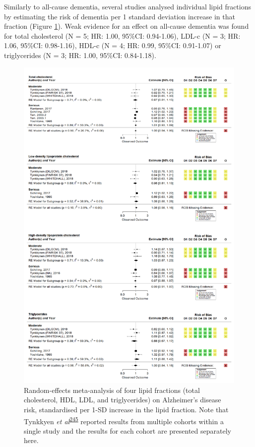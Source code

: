 \documentclass[a4paper, twoside]{templates/ociamthesis}
\begin{document}
Similarly to all-cause dementia, several studies analysed individual lipid fractions by estimating the risk of dementia per 1 standard deviation increase in that fraction (Figure \ref{fig:lipidFractionsAD}). Weak evidence for an effect on all-cause dementia was found for total cholesterol (N = 5; HR: 1.00, 95\%CI: 0.94-1.06), LDL-c (N = 3; HR: 1.06, 95\%CI: 0.98-1.16), HDL-c (N = 4; HR: 0.99, 95\%CI: 0.91-1.07) or triglycerides (N = 3; HR: 1.00, 95\%CI: 0.84-1.18).





\begin{figure}[H]
\includegraphics[width=1\linewidth]{figures/sys-rev/fp_lipids_composite_AD} \caption[Random-effects meta-analysis of four lipid fractions on Alzheimer's disease]{Random-effects meta-analysis of four lipid fractions (total cholesterol, HDL, LDL, and triglycerides) on Alzheimer's disease risk, standardised per 1-SD increase in the lipid fraction. Note that Tynkkyen \emph{et al}\textsuperscript{\protect\hyperlink{ref-tynkkynen2018}{245}} reported results from multiple cohorts within a single study and the results for each cohort are presented separately here.}\label{fig:lipidFractionsAD}
\end{figure}
\end{document}
